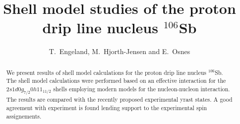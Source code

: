 



\draft

\title{Shell model studies of the proton drip line nucleus $^{106}$Sb}

\author{T.\ Engeland, M.\ Hjorth-Jensen and E.\ Osnes}

\address{Department of Physics,
         University of Oslo, N-0316 Oslo, Norway}

\maketitle

\begin{abstract}

We present results of shell model calculations for the proton drip
line nucleus $^{106}$Sb.
The shell model calculations were performed based on an effective
interaction for the $2s1d0g_{7/2}0h11_{11/2}$ shells employing 
modern models for the nucleon-nucleon interaction. 
The results are compared with the recently 
proposed experimental yrast states. 
A good agreement with experiment 
is found lending support to the experimental
spin assignements. 
\end{abstract}


